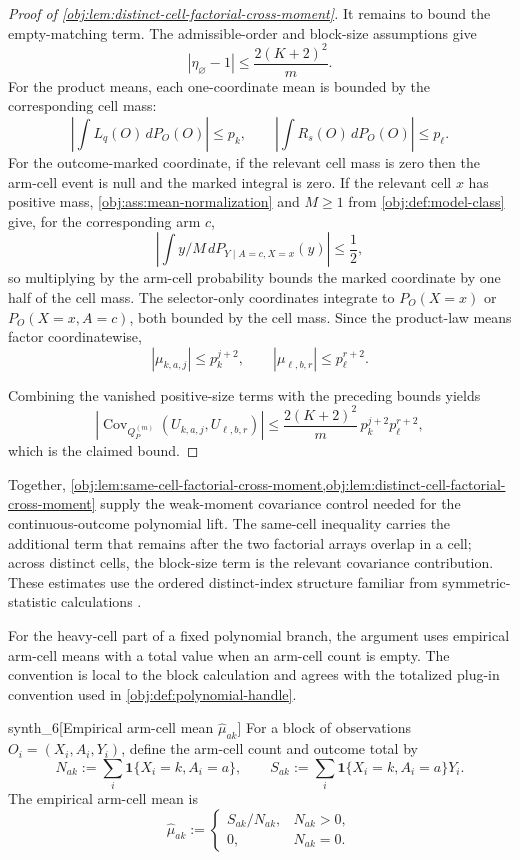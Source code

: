 \documentclass[11pt]{article}
\begin{document}
\begin{proof}[Proof of \cref{obj:lem:distinct-cell-factorial-cross-moment}]
It remains to bound the empty-matching term.  The admissible-order and block-size assumptions give
\[
|\eta_{\varnothing}-1|
\le
\frac{2(K+2)^2}{m}.
\]
For the product means, each one-coordinate mean is bounded by the corresponding cell mass:
\[
\left|\int L_q(O)\,dP_O(O)\right|\le p_k,
\qquad
\left|\int R_s(O)\,dP_O(O)\right|\le p_{\ell}.
\]
For the outcome-marked coordinate, if the relevant cell mass is zero then the arm-cell event is null and the marked integral is zero.  If the relevant cell \(x\) has positive mass, \cref{obj:ass:mean-normalization} and \(M\ge1\) from \cref{obj:def:model-class} give, for the corresponding arm \(c\),
\[
\left|\int y/M\,dP_{Y\mid A=c,X=x}(y)\right|\le \frac12,
\]
so multiplying by the arm-cell probability bounds the marked coordinate by one half of the cell mass.  The selector-only coordinates integrate to \(P_O(X=x)\) or \(P_O(X=x,A=c)\), both bounded by the cell mass.  Since the product-law means factor coordinatewise,
\[
|\mu_{k,a,j}|
\le p_k^{j+2},
\qquad
|\mu_{\ell,b,r}|
\le p_{\ell}^{r+2}.
\]

Combining the vanished positive-size terms with the preceding bounds yields
\[
\left|\operatorname{Cov}_{Q_P^{(m)}}(U_{k,a,j},U_{\ell,b,r})\right|
\le
\frac{2(K+2)^2}{m}\,
p_k^{j+2}p_{\ell}^{r+2},
\]
which is the claimed bound. %
\end{proof}

Together, \cref{obj:lem:same-cell-factorial-cross-moment,obj:lem:distinct-cell-factorial-cross-moment} supply the weak-moment covariance control needed for the continuous-outcome polynomial lift. The same-cell inequality carries the additional term that remains after the two factorial arrays overlap in a cell; across distinct cells, the block-size term is the relevant covariance contribution. These estimates use the ordered distinct-index structure familiar from symmetric-statistic calculations \citep{Hoeffding1948,Serfling1980}.

For the heavy-cell part of a fixed polynomial branch, the argument uses empirical arm-cell means with a total value when an arm-cell count is empty. The convention is local to the block calculation and agrees with the totalized plug-in convention used in \cref{obj:def:polynomial-handle}.

\begin{definitionv}{synth_6}[Empirical arm-cell mean \(\widehat\mu_{ak}\)]
For a block of observations \(O_i=(X_i,A_i,Y_i)\), define the arm-cell count and outcome total by \[N_{ak}:=\sum_i \mathbf 1\{X_i=k,A_i=a\},\qquad S_{ak}:=\sum_i \mathbf 1\{X_i=k,A_i=a\}Y_i .\] The empirical arm-cell mean is \[\widehat\mu_{ak}:=\begin{cases}S_{ak}/N_{ak},&N_{ak}>0,\\ 0,&N_{ak}=0.\end{cases}\]
\end{definitionv}
\end{document}
